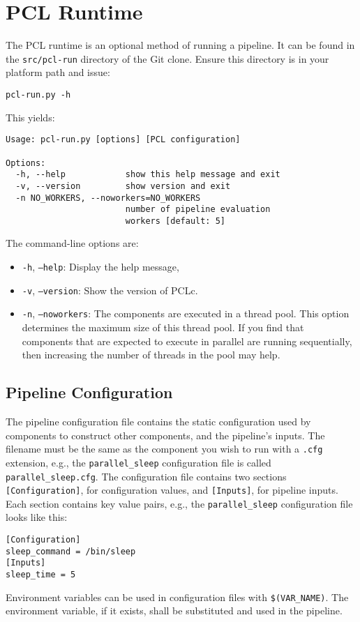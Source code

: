 \chapter{PCL Runtime}
The PCL runtime is an optional method of running a pipeline. It can be found in the \texttt{src/pcl-run} directory of the Git clone. Ensure this directory is in your platform path and issue:
\begin{verbatim}
pcl-run.py -h
\end{verbatim}
This yields:
\begin{verbatim}
Usage: pcl-run.py [options] [PCL configuration]

Options:
  -h, --help            show this help message and exit
  -v, --version         show version and exit
  -n NO_WORKERS, --noworkers=NO_WORKERS
                        number of pipeline evaluation
                        workers [default: 5]
\end{verbatim}

The command-line options are:
\begin{itemize}
\item \texttt{-h}, \texttt{--help}: Display the help message,
\item \texttt{-v}, \texttt{--version}: Show the version of PCLc.
\item \texttt{-n}, \texttt{--noworkers}: The components are executed in a thread pool. This option determines the maximum size of this thread pool. If you find that components that are expected to execute in parallel are running sequentially, then increasing the number of threads in the pool may help.
\end{itemize}

\section{Pipeline Configuration}
The pipeline configuration file contains the static configuration used by components to construct other components, and the pipeline's inputs. The filename must be the same as the component you wish to run with a \texttt{.cfg} extension, e.g., the \texttt{parallel\_sleep} configuration file is called \texttt{parallel\_sleep.cfg}. The configuration file contains two sections \texttt{[Configuration]}, for configuration values, and \texttt{[Inputs]}, for pipeline inputs. Each section contains key value pairs, e.g., the \texttt{parallel\_sleep} configuration file looks like this:
\begin{verbatim}
[Configuration]
sleep_command = /bin/sleep
[Inputs]
sleep_time = 5
\end{verbatim}
Environment variables can be used in configuration files with \texttt{\$(VAR\_NAME)}. The environment variable, if it exists, shall be substituted and used in the pipeline.

